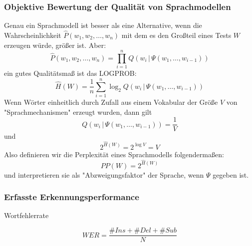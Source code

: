 \subsubsection*{Objektive Bewertung der Qualität von Sprachmodellen}

Genau ein Sprachmodell ist besser als eine Alternative, wenn die Wahrscheinlichkeit $\hat{P}(w_1,w_2,\dots ,w_n)$ mit dem es den Großteil eines Tests $W$ erzeugen würde, größer ist. Aber:
$$\hat{P}(w_1,w_2,\dots ,w_n) = \prod\limits_{i=1}^n Q(w_i \, | \, \Psi(w_1,\dots,w_{i-1}))$$
ein gutes Qualitätsmaß ist das LOGPROB:
$$\hat{H}(W) = \frac{1}{n} \sum\limits_{i=1}^n \log_2 Q(w_i \, | \, \Psi(w_1,\dots,w_{i-1}))$$
Wenn Wörter einheitlich durch Zufall aus einem Vokabular der Größe $V$ von "{}Sprachmechanismen"{} erzeugt wurden, dann gilt
$$Q(w_i \, | \, \Psi(w_1,\dots,w_{i-1})) = \frac{1}{V}$$ und $$2^{\hat{H}(W)} = 2^{\log V} = V$$
Also definieren wir die Perplexität eines Sprachmodells folgendermaßen: $$PP(W) = 2^{\hat{H}(W)}$$
und interpretieren sie als "{}Abzweigungsfaktor"{} der Sprache, wenn $\Psi$ gegeben ist.

\subsubsection*{Erfasste Erkennungsperformance}

Wortfehlerrate

$$WER = \frac{\# Ins + \# Del + \# Sub}{N}$$





